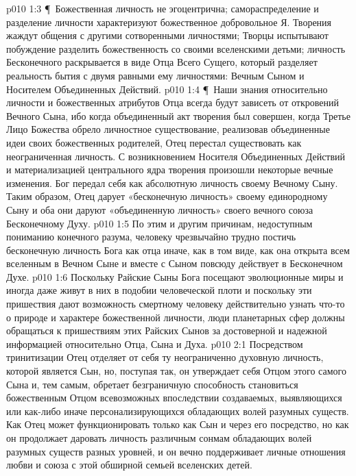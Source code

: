 \vs p010 1:3 \P\ Божественная личность не эгоцентрична; самораспределение и разделение личности характеризуют божественное добровольное Я. Творения жаждут общения с другими сотворенными личностями; Творцы испытывают побуждение разделить божественность со своими вселенскими детьми; личность Бесконечного раскрывается в виде Отца Всего Сущего, который разделяет реальность бытия с двумя равными ему личностями: Вечным Сыном и Носителем Объединенных Действий.
\vs p010 1:4 \P\ Наши знания относительно личности и божественных атрибутов Отца всегда будут зависеть от откровений Вечного Сына, ибо когда объединенный акт творения был совершен, когда Третье Лицо Божества обрело личностное существование, реализовав объединенные идеи своих божественных родителей, Отец перестал существовать как неограниченная личность. С возникновением Носителя Объединенных Действий и материализацией центрального ядра творения произошли некоторые вечные изменения. Бог передал себя как абсолютную личность своему Вечному Сыну. Таким образом, Отец дарует «бесконечную личность» своему единородному Сыну и оба они даруют «объединенную личность» своего вечного союза Бесконечному Духу.
\vs p010 1:5 По этим и другим причинам, недоступным пониманию конечного разума, человеку чрезвычайно трудно постичь бесконечную личность Бога как отца иначе, как в том виде, как она открыта всем вселенным в Вечном Сыне и вместе с Сыном повсюду действует в Бесконечном Духе.
\vs p010 1:6 Поскольку Райские Сыны Бога посещают эволюционные миры и иногда даже живут в них в подобии человеческой плоти и поскольку эти пришествия дают возможность смертному человеку действительно узнать что\hyp{}то о природе и характере божественной личности, люди планетарных сфер должны обращаться к пришествиям этих Райских Сынов за достоверной и надежной информацией относительно Отца, Сына и Духа.
\vs p010 2:1 Посредством тринитизации Отец отделяет от себя ту неограниченно духовную личность, которой является Сын, но, поступая так, он утверждает себя Отцом этого самого Сына и, тем самым, обретает безграничную способность становиться божественным Отцом всевозможных впоследствии создаваемых, выявляющихся или как\hyp{}либо иначе персонализирующихся обладающих волей разумных существ. Как  Отец может функционировать только как Сын и через его посредство, но как  он продолжает даровать личность различным сонмам обладающих волей разумных существ разных уровней, и он вечно поддерживает личные отношения любви и союза с этой обширной семьей вселенских детей.
